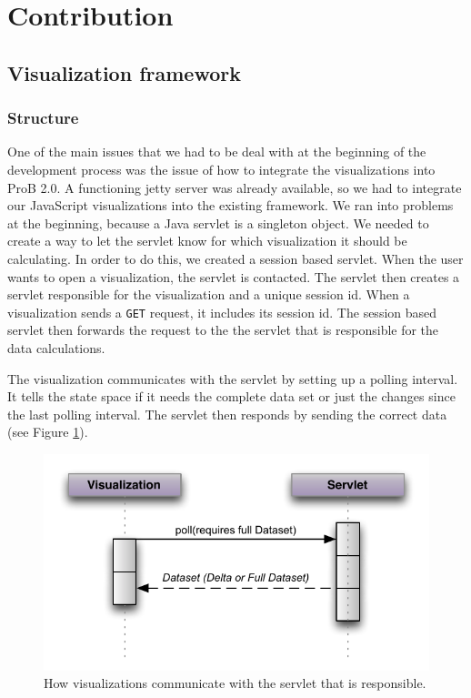 \section{Contribution}

\subsection{Visualization framework}

\subsubsection{Structure}

One of the main issues that we had to be deal with at the beginning of the development process was the issue of how to integrate the visualizations into ProB 2.0. A functioning jetty server was already available, so we had to integrate our JavaScript visualizations into the existing framework. We ran into problems at the beginning, because a Java servlet is a singleton object. We needed to create a way to let the servlet know for which visualization it should be calculating. In order to do this, we created a session based servlet. When the user wants to open a visualization, the servlet is contacted. The servlet then creates a servlet responsible for the visualization and a unique session id. When a visualization sends a \texttt{GET} request, it includes its session id. The session based servlet then forwards the request to the the servlet that is responsible for the data calculations.

The visualization communicates with the servlet by setting up a polling interval. It tells the state space if it needs the complete data set or just the changes since the last polling interval. The servlet then responds by sending the correct data (see Figure \ref{communication}).

\begin{center}
\begin{figure}[h!]
\includegraphics[width=14cm]{bilder/communication.pdf}
\caption{How visualizations communicate with the servlet that is responsible.}
\label{communication}
\end{figure}
\end{center}


